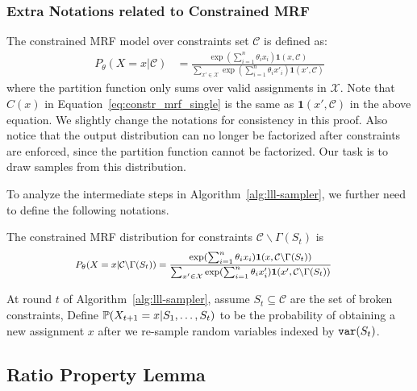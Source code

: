 \subsubsection{Extra Notations related to Constrained MRF}
The constrained MRF model over constraints set $\mathcal{C}$ is defined as:
\begin{align*}
P_{\theta}(X=x|\mathcal{C})&=\frac{\exp(\sum_{i=1}^n\theta_i x_i)\mathbf{1}(x,\mathcal{C})}{\sum_{x'\in\mathcal{X}}\exp(\sum_{i=1}^n\theta_i x'_i)\mathbf{1}(x',\mathcal{C})}
\end{align*}
where the partition function only sums over valid assignments in $\mathcal{X}$. Note that $C(x)$ in Equation~\eqref{eq:constr_mrf_single} is the same as $\mathbf{1}(x',\mathcal{C})$ in the above equation. We slightly change the notations for consistency in this proof. Also notice that the output distribution can no longer be factorized after constraints are enforced, since the partition function cannot be factorized. Our task is to draw samples from this distribution. 

To analyze the intermediate steps in Algorithm~\ref{alg:lll-sampler}, we further need to define the following notations.
\begin{definition}  \label{def:general-cmrf}
The constrained MRF distribution for constraints $\mathcal{C}\backslash \Gamma(S_t)$ is
\begin{equation*}\footnotesize
\begin{aligned}
P_{\theta}(X=x|\mathcal{C}\backslash \Gamma(S_t))&=\frac{\exp(\sum_{i=1}^n\theta_i x_i)\mathbf{1}(x,\mathcal{C}\backslash \Gamma(S_t))}{\sum_{x'\in\mathcal{X}}\exp(\sum_{i=1}^n\theta_i x'_i)\mathbf{1}(x',\mathcal{C}\backslash \Gamma(S_t))}
\end{aligned}
\end{equation*}
\end{definition}

\begin{definition}  \label{def:prs-prob}
At round $t$ of Algorithm~\ref{alg:lll-sampler}, assume $S_t\subseteq\mathcal{C}$ are the set of broken constraints,  Define $\mathbb{P}(X_{t+1}=x|S_1,\ldots, S_t)$ to be the probability of obtaining a new assignment $x$ after we re-sample random variables indexed by $\mathtt{var}(S_t)$.
\end{definition}









\subsection{Ratio Property Lemma}



